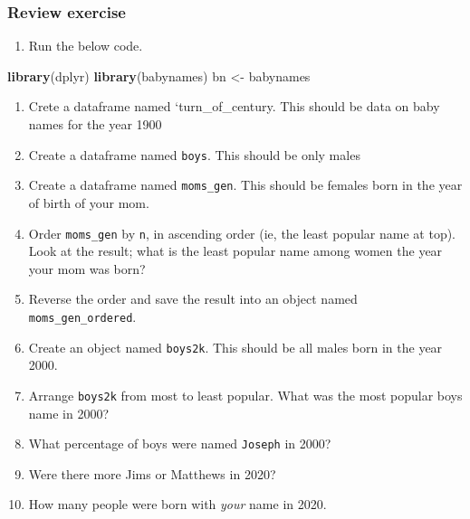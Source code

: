 \documentclass[
]{book}
\newenvironment{Shaded}{\begin{snugshade}}{\end{snugshade}}
\newcommand{\KeywordTok}[1]{\textcolor[rgb]{0.13,0.29,0.53}{\textbf{#1}}}
\newcommand{\NormalTok}[1]{#1}
\newcommand{\StringTok}[1]{\textcolor[rgb]{0.31,0.60,0.02}{#1}}
\providecommand{\tightlist}{%
  \setlength{\itemsep}{0pt}\setlength{\parskip}{0pt}}
\begin{document}
\hypertarget{review-exercise-1}{%
\subsubsection*{Review exercise}\label{review-exercise-1}}

\begin{enumerate}
\def\labelenumi{\arabic{enumi}.}
\tightlist
\item
  Run the below code.
\end{enumerate}

\begin{Shaded}
\begin{Highlighting}[]
\KeywordTok{library}\NormalTok{(dplyr)}
\KeywordTok{library}\NormalTok{(babynames)}
\NormalTok{bn <-}\StringTok{ }\NormalTok{babynames}
\end{Highlighting}
\end{Shaded}

\begin{enumerate}
\def\labelenumi{\arabic{enumi}.}
\setcounter{enumi}{1}
\item
  Crete a dataframe named `turn\_of\_century. This should be data on baby names for the year 1900
\item
  Create a dataframe named \texttt{boys}. This should be only males
\item
  Create a dataframe named \texttt{moms\_gen}. This should be females born in the year of birth of your mom.
\item
  Order \texttt{moms\_gen} by \texttt{n}, in ascending order (ie, the least popular name at top). Look at the result; what is the least popular name among women the year your mom was born?
\item
  Reverse the order and save the result into an object named \texttt{moms\_gen\_ordered}.
\item
  Create an object named \texttt{boys2k}. This should be all males born in the year 2000.
\item
  Arrange \texttt{boys2k} from most to least popular. What was the most popular boys name in 2000?
\item
  What percentage of boys were named \texttt{Joseph} in 2000?
\item
  Were there more Jims or Matthews in 2020?
\item
  How many people were born with \emph{your} name in 2020.
\end{enumerate}
\end{document}
